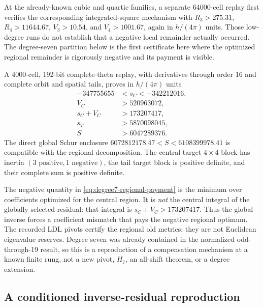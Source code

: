 \documentclass[11pt]{article}
\theoremstyle{definition}
\theoremstyle{remark}
\begin{document}
At the already-known cubic and quartic families, a separate 64000-cell replay
first verifies the corresponding integrated-square mechanism with
$R_3>275.31$, $R_4>11644.67$, $V_3>10.54$, and $V_4>1001.67$, again in
$h/(4\pi)$ units. Those low-degree runs do not establish that a negative local
remainder actually occurred. The degree-seven partition below is the first
certificate here where the optimized regional remainder is rigorously
negative and its payment is visible.

A 4000-cell, 192-bit complete-theta replay, with derivatives through order 16
and complete orbit and spatial tails, proves in $h/(4\pi)$ units
\begin{align}
 -347755655&<s_C<-342212016,\nonumber\\
 V_C&>520963072,\nonumber\\
 s_C+V_C&>173207417,\nonumber\\
 s_T&>5870098045,\nonumber\\
 S&>6047289376.
 \label{eq:degree7-regional-payment}
\end{align}
The direct global Schur enclosure
$6072812178.47<S<6108399978.41$ is compatible with the regional
decomposition. The central target $4\times4$ block has inertia
$(3\text{ positive},1\text{ negative})$, the tail target block is positive
definite, and their complete sum is positive definite.

The negative quantity in \eqref{eq:degree7-regional-payment} is the minimum
over coefficients optimized for the central region. It is \emph{not} the
central integral of the globally selected residual: that integral is
$s_C+V_C>173207417$. Thus the global inverse forces a coefficient mismatch
that pays the negative regional optimum. The recorded LDL pivots certify the
regional old metrics; they are not Euclidean eigenvalue reserves. Degree seven
was already contained in the normalized odd-through-19 result, so this is a
reproduction of a compensation mechanism at a known finite rung, not a new
pivot, $H_7$, an all-shift theorem, or a degree extension.

\subsection{A conditioned inverse-residual reproduction}
\end{document}
